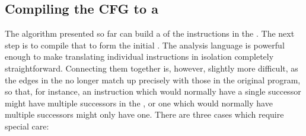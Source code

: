\subsection{Compiling the CFG to a \StateMachine}
\label{sect:derive:compile_cfg}


The algorithm presented so far can build a  of the
instructions in the .  The next step is to
compile that  to form the initial {\StateMachine}.  The
{\StateMachine} analysis language is powerful enough to make
translating individual instructions in isolation completely
straightforward.  Connecting them together is, however, slightly more
difficult, as the edges in the  no longer match up
precisely with those in the original program, so that, for instance,
an instruction which would normally have a single successor might have
multiple successors in the , or one which would normally
have multiple successors might only have one.  There are three cases
which require special care:

